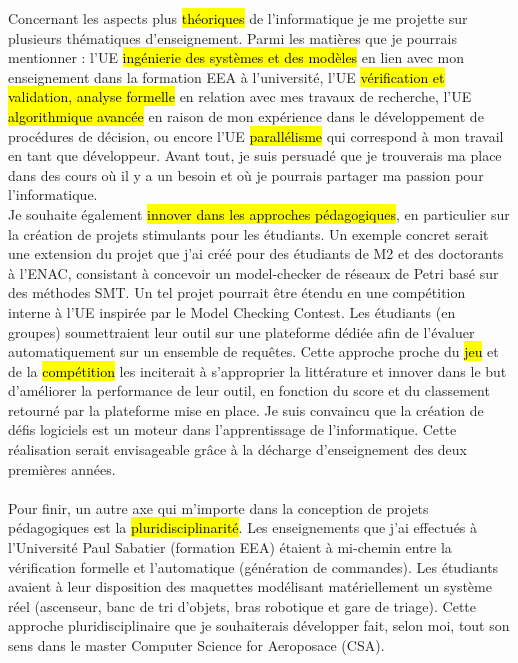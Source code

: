 Concernant les aspects plus \hl{théoriques} de l'informatique je me projette sur
plusieurs thématiques d'enseignement. Parmi les matières que je pourrais
mentionner : l'UE \og \hl{ingénierie des systèmes et des modèles} \fg en lien
avec mon enseignement dans la formation EEA à l'université, l'UE \og
\hl{vérification et validation, analyse formelle} \fg en relation avec mes
travaux de recherche, l'UE \og \hl{algorithmique avancée} \fg en raison de mon
expérience dans le développement de procédures de décision, ou encore l'UE \og
\hl{parallélisme} \fg qui correspond à mon travail en tant que développeur.
Avant tout, je suis persuadé que je trouverais ma place dans des cours où il y a
un besoin et où je pourrais partager ma passion pour l'informatique.\\


Je souhaite également \hl{innover dans les approches pédagogiques}, en
particulier sur la création de projets stimulants pour les étudiants. Un exemple
concret serait une extension du projet que j'ai créé pour des étudiants de M2 et
des doctorants à l'ENAC, consistant à concevoir un model-checker de réseaux de
Petri basé sur des méthodes SMT. Un tel projet pourrait être étendu en une
compétition interne à l'UE inspirée par le Model Checking Contest. Les étudiants
(en groupes) soumettraient leur outil sur une plateforme dédiée afin de
l'évaluer automatiquement sur un ensemble de requêtes. Cette approche proche du
\hl{jeu} et de la \hl{compétition} les inciterait à s'approprier la littérature
et innover dans le but d'améliorer la performance de leur outil, en fonction du
score et du classement retourné par la plateforme mise en place. Je suis
convaincu que la création de défis logiciels est un moteur dans l'apprentissage
de l'informatique. Cette réalisation serait envisageable grâce à la décharge
d'enseignement des deux premières années.\\\\


Pour finir, un autre axe qui m'importe dans la conception de projets
pédagogiques est la \hl{pluridisciplinarité}. Les enseignements que j'ai
effectués à l'Université Paul Sabatier (formation EEA) étaient à mi-chemin entre
la vérification formelle et l'automatique (génération de commandes). Les
étudiants avaient à leur disposition des maquettes modélisant matériellement un
système réel (ascenseur, banc de tri d'objets, bras robotique et gare de
triage). Cette approche pluridisciplinaire que je souhaiterais développer fait,
selon moi, tout son sens dans le master Computer Science for Aeroposace (CSA).\\